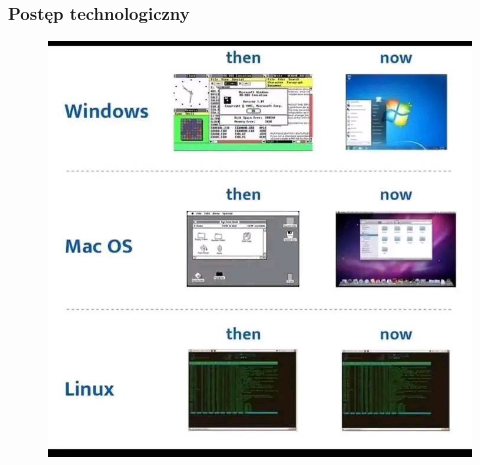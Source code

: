 \documentclass[10pt,t]{beamer}
\begin{document}
\begin{frame}
  \frametitle{Postęp technologiczny}

  \vspace{-0.5em}


  \begin{figure}

    \label{fig:Evolution-of-OS}

    \centering


    \includegraphics[scale=0.3]
    {./Presentations-pictures/Evolution-of-operating-systems.jpg}

  \end{figure}

\end{frame}
\end{document}
